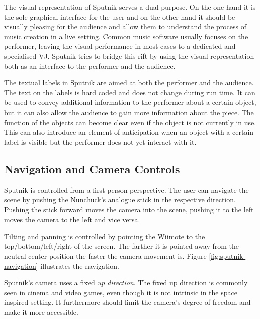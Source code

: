 \documentclass[10pt,a4paper]{scrartcl}
\begin{document}
The visual representation of Sputnik serves a dual purpose. On the one hand it is the sole graphical interface for the user and on the other hand it should be visually pleasing for the audience and allow them to understand the process of music creation in a live setting. Common music software usually focuses on the performer, leaving the visual performance in most cases to a dedicated and specialised VJ. Sputnik tries to bridge this rift by using the visual representation both as an interface to the performer and the audience. 


The textual labels in Sputnik are aimed at both the performer and the audience. The text on the labels is hard coded and does not change during run time. It can be used to convey additional information to the performer about a certain object, but it can also allow the audience to gain more information about the piece. The function of the objects can become clear even if the object is not currently in use. This can also introduce an element of anticipation when an object with a certain label is visible but the performer does not yet interact with it.





\subsection{Navigation and Camera Controls}
Sputnik is controlled from a first person perspective. The user can navigate the scene by pushing the Nunchuck's analogue stick in the respective direction. Pushing the stick forward moves the camera into the scene, pushing it to the left moves the camera to the left and vice versa.

Tilting and panning is controlled by pointing the Wiimote to the top/bottom/left/right of the screen. The farther it is pointed away from the neutral center position the faster the camera movement is. Figure \ref{fig:sputnik-navigation} illustrates the navigation.

Sputnik's camera uses a fixed \emph{up direction}. The fixed up direction is commonly seen in cinema and video games, even though it is not intrinsic in the space inspired setting. It furthermore should limit the camera's degree of freedom and make it more accessible.
\end{document}
